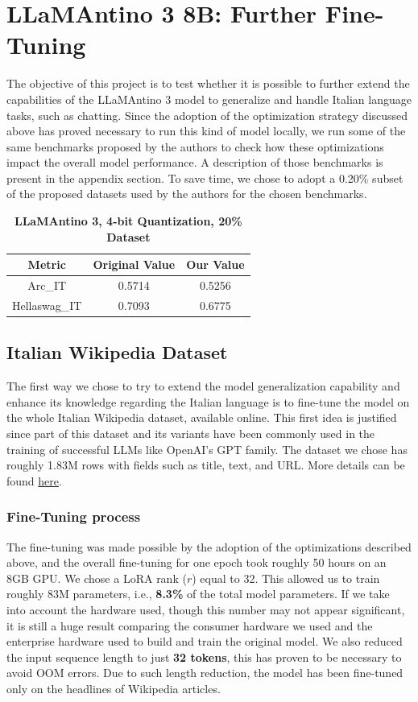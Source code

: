 \documentclass{article}
\begin{document}
	\section{LLaMAntino 3 8B: Further Fine-Tuning}
	The objective of this project is to test whether it is possible to further extend the capabilities of the LLaMAntino 3 model to generalize and handle Italian language tasks, such as chatting.
	Since the adoption of the optimization strategy discussed above has proved necessary to run this kind of model locally, we run some of the same benchmarks proposed by the authors to check how these optimizations impact the overall model performance. 
	A description of those benchmarks is present in the appendix section.  
	To save time, we chose to adopt a 0.20\% subset of the proposed datasets used by the authors for the chosen benchmarks.
	
	\begin{table}[h]
		\center
		\begin{tabular}{ccc}
			\toprule
			\textbf{Metric} & \textbf{Original Value} & \textbf{Our Value} \\
			\midrule
			Arc\_IT & 0.5714 & 0.5256 \\
			Hellaswag\_IT &	0.7093 & 0.6775 \\
			\bottomrule
		\end{tabular}
		\caption{\textbf{LLaMAntino 3, 4-bit Quantization, 20\% Dataset}}
	\end{table}
	
	\subsection{Italian Wikipedia Dataset}
	The first way we chose to try to extend the model generalization capability and enhance its knowledge regarding the Italian language is to fine-tune the model on the whole Italian Wikipedia dataset, available online.
	This first idea is justified since part of this dataset and its variants have been commonly used in the training of successful LLMs like OpenAI's GPT family. The dataset we chose has roughly 1.83M rows with fields such as title, text, and URL. More details can be found \href{https://huggingface.co/datasets/wikimedia/wikipedia/viewer/20231101.it}{here}.
	
	\subsubsection{Fine-Tuning process}
	The fine-tuning was made possible by the adoption of the optimizations described above, and the overall fine-tuning for one epoch took roughly 50 hours on an 8GB GPU.
	We chose a LoRA rank ($r$) equal to 32. This allowed us to train roughly 83M parameters, i.e., \textbf{8.3\%} of the total model parameters.
	If we take into account the hardware used, though this number may not appear significant, it is still a huge result comparing the consumer hardware we used and the enterprise hardware used to build and train the original model.
	We also reduced the input sequence length to just \textbf{32 tokens}, this has proven to be necessary to avoid OOM errors. Due to such length reduction, the model has been fine-tuned only on the headlines of Wikipedia articles.  
		
\end{document}
